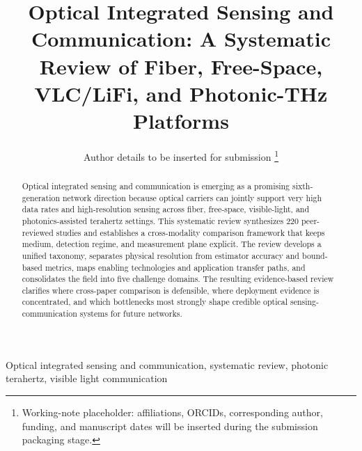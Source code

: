 \title{Optical Integrated Sensing and Communication: A Systematic Review of Fiber, Free-Space, VLC/LiFi, and Photonic-THz Platforms}

\author{%
Author details to be inserted for submission%
\thanks{Working-note placeholder: affiliations, ORCIDs, corresponding author, funding, and manuscript dates will be inserted during the submission packaging stage.}%
}


\maketitle

\begin{abstract}
Optical integrated sensing and communication is emerging as a promising sixth-generation network direction because optical carriers can jointly support very high data rates and high-resolution sensing across fiber, free-space, visible-light, and photonics-assisted terahertz settings. This systematic review synthesizes 220 peer-reviewed studies and establishes a cross-modality comparison framework that keeps medium, detection regime, and measurement plane explicit. The review develops a unified taxonomy, separates physical resolution from estimator accuracy and bound-based metrics, maps enabling technologies and application transfer paths, and consolidates the field into five challenge domains. The resulting evidence-based review clarifies where cross-paper comparison is defensible, where deployment evidence is concentrated, and which bottlenecks most strongly shape credible optical sensing-communication systems for future networks.
\end{abstract}

\begin{IEEEkeywords}
Optical integrated sensing and communication, systematic review, photonic terahertz, visible light communication
\end{IEEEkeywords}
